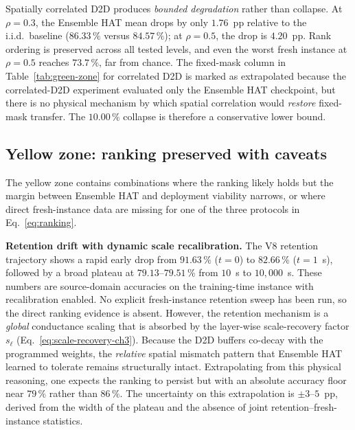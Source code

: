 Spatially correlated D2D produces \emph{bounded degradation} rather than collapse.  At $\rho=0.3$, the Ensemble HAT mean drops by only $1.76$~pp relative to the i.i.d.~baseline ($86.33\,\%$ versus $84.57\,\%$); at $\rho=0.5$, the drop is $4.20$~pp.  Rank ordering is preserved across all tested levels, and even the worst fresh instance at $\rho=0.5$ reaches $73.7\,\%$, far from chance.  The fixed-mask column in Table~\ref{tab:green-zone} for correlated D2D is marked as extrapolated because the correlated-D2D experiment evaluated only the Ensemble HAT checkpoint, but there is no physical mechanism by which spatial correlation would \emph{restore} fixed-mask transfer.  The $10.00\,\%$ collapse is therefore a conservative lower bound.

\subsection{Yellow zone: ranking preserved with caveats}

The yellow zone contains combinations where the ranking likely holds but the margin between Ensemble HAT and deployment viability narrows, or where direct fresh-instance data are missing for one of the three protocols in Eq.~\ref{eq:ranking}.

\textbf{Retention drift with dynamic scale recalibration.}  The V8 retention trajectory shows a rapid early drop from $91.63\,\%$ ($t=0$) to $82.66\,\%$ ($t=1$~s), followed by a broad plateau at $79.13$--$79.51\,\%$ from $10$~s to $10{,}000$~s.  These numbers are source-domain accuracies on the training-time instance with recalibration enabled.  No explicit fresh-instance retention sweep has been run, so the direct ranking evidence is absent.  However, the retention mechanism is a \emph{global} conductance scaling that is absorbed by the layer-wise scale-recovery factor $s_{\ell}$ (Eq.~\ref{eq:scale-recovery-ch3}).  Because the D2D buffers co-decay with the programmed weights, the \emph{relative} spatial mismatch pattern that Ensemble HAT learned to tolerate remains structurally intact.  Extrapolating from this physical reasoning, one expects the ranking to persist but with an absolute accuracy floor near $79\,\%$ rather than $86\,\%$.  The uncertainty on this extrapolation is $\pm 3$--$5$~pp, derived from the width of the plateau and the absence of joint retention--fresh-instance statistics.

